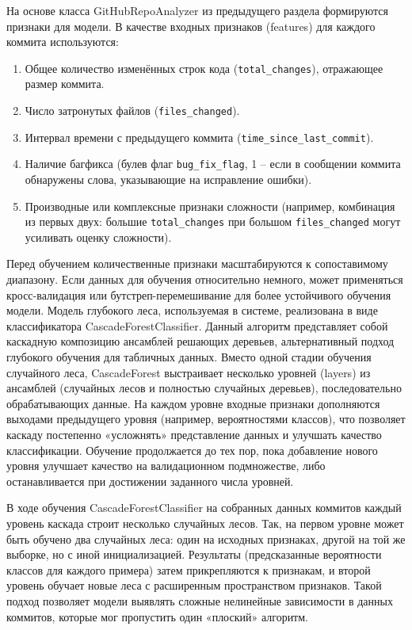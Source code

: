 На основе класса GitHubRepoAnalyzer из предыдущего раздела формируются признаки для модели. В качестве входных признаков (features) для каждого коммита используются:
\begin{enumerate}
	\item Общее количество изменённых строк кода (\verb|total_changes|), отражающее размер коммита.
	\item Число затронутых файлов (\verb|files_changed|).
	\item Интервал времени с предыдущего коммита (\verb|time_since_last_commit|).
	\item Наличие багфикса (булев флаг \verb|bug_fix_flag|, 1 – если в сообщении коммита обнаружены слова, указывающие на исправление ошибки).
	\item Производные или комплексные признаки сложности (например, комбинация из первых двух: большие \verb|total_changes| при большом \verb|files_changed| могут усиливать оценку сложности).
\end{enumerate}


Перед обучением количественные признаки масштабируются к сопоставимому диапазону. Если данных для обучения относительно немного, может применяться кросс-валидация или бутстреп-перемешивание для более устойчивого обучения модели. Модель глубокого леса, используемая в системе, реализована в виде классификатора CascadeForestClassifier. Данный алгоритм представляет собой каскадную композицию ансамблей решающих деревьев, альтернативный подход глубокого обучения для табличных данных. Вместо одной стадии обучения случайного леса, CascadeForest выстраивает несколько уровней (layers) из ансамблей (случайных лесов и полностью случайных деревьев), последовательно обрабатывающих данные. На каждом уровне входные признаки дополняются выходами предыдущего уровня (например, вероятностями классов), что позволяет каскаду постепенно «усложнять» представление данных и улучшать качество классификации. Обучение продолжается до тех пор, пока добавление нового уровня улучшает качество на валидационном подмножестве, либо останавливается при достижении заданного числа уровней.

В ходе обучения CascadeForestClassifier на собранных данных коммитов каждый уровень каскада строит несколько случайных лесов. Так, на первом уровне может быть обучено два случайных леса: один на исходных признаках, другой на той же выборке, но с иной инициализацией. Результаты (предсказанные вероятности классов для каждого примера) затем прикрепляются к признакам, и второй уровень обучает новые леса с расширенным пространством признаков. Такой подход позволяет модели выявлять сложные нелинейные зависимости в данных коммитов, которые мог пропустить один «плоский» алгоритм.

